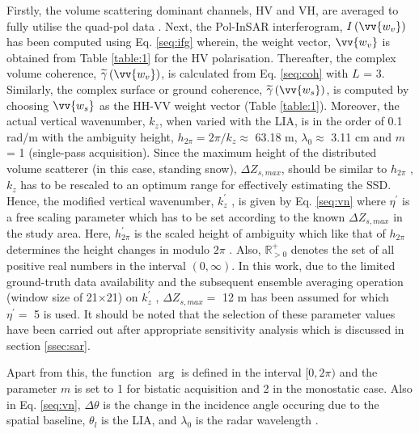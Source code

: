 \documentclass[12pt]{elsarticle}
\numberwithin{equation}{section}
\numberwithin{figure}{section}
\numberwithin{table}{section}
\begin{document}
Firstly, the volume scattering dominant channels, HV and VH, are averaged to fully utilise the quad-pol data \citep{Cloude2005}. Next, the Pol-InSAR interferogram, $I\left(\vv{w_v}\right)$ has been computed using Eq. \eqref{seq:ifg} wherein, the weight vector, $\vv{w_v}$ is obtained from Table \ref{table:1} for the HV polarisation. Thereafter, the complex volume coherence, $\widetilde{\gamma}\left(\vv{w_v}\right)$, is calculated from Eq. \eqref{seq:coh} with $L$ = 3. Similarly, the complex surface or ground coherence, $\widetilde{\gamma}\left(\vv{w_s}\right)$, is computed by choosing $\vv{w_s}$ as the HH-VV weight vector (Table \ref{table:1}). Moreover, the actual vertical wavenumber, $k_z$, when varied with the LIA, is in the order of 0.1 rad/m with the ambiguity height, $h_{2\pi} = 2\pi/k_z \approx$ 63.18 m, $\lambda_0 \approx$ 3.11 cm and $m$ = 1 (single-pass acquisition). Since the maximum height of the distributed volume scatterer (in this case, standing snow), $\Delta{Z_{s,max}}$, should be similar to $h_{2\pi}$ \citep{Kugler2015, Hajnsek2009, Kumar2017}, $k_z$ has to be rescaled to an optimum range for effectively estimating the SSD. Hence, the modified vertical wavenumber, $k_z^\prime$ , is given by Eq. \eqref{seq:vn} where $\eta^\prime$ is a free scaling parameter which has to be set according to the known $\Delta{Z_{s,max}}$ in the study area. Here, $h_{2\pi}^\prime$ is the scaled height of ambiguity which like that of $h_{2\pi}$ determines the height changes in modulo $2\pi$ \citep{Hanssen2001}. Also, $\mathbb{R}_{>0}^+$ denotes the set of all positive real numbers in the interval $(0, \infty)$. In this work, due to the limited ground-truth data availability and the subsequent ensemble averaging operation (window size of 21$\times$21) on $k_z^\prime$ , $\Delta{Z_{s,max}} = $ 12 m has been assumed for which $\eta^\prime = $ 5 is used. It should be noted that the selection of these parameter values have been carried out after appropriate sensitivity analysis which is discussed in section \ref{ssec:sar}.

Apart from this, the function $\arg$ is defined in the interval $[0, 2\pi)$ and the parameter $m$ is set to 1 for bistatic acquisition and 2 in the monostatic case. Also in Eq. \eqref{seq:vn}, $\Delta\theta$ is the change in the incidence angle occuring due to the spatial baseline, $\theta_l$ is the LIA, and $\lambda_0$ is the radar wavelength \citep{Cloude2010, Kugler2015}.
\end{document}
